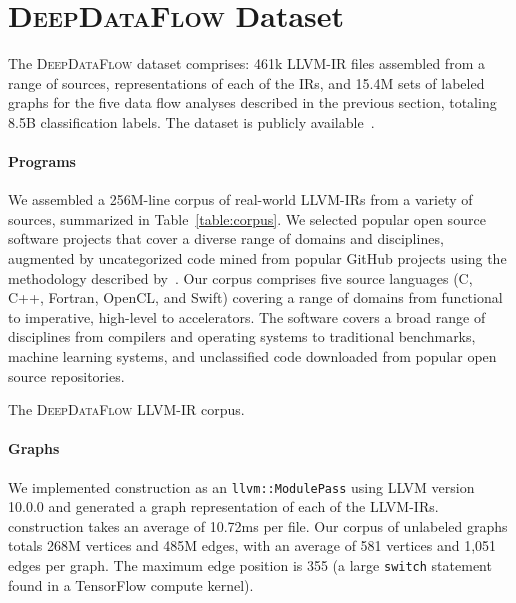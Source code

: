 \section{\textsc{DeepDataFlow} Dataset}

The \textsc{DeepDataFlow} dataset comprises: 461k LLVM-IR files assembled from a
range of sources, \programl representations of each of the IRs, and 15.4M sets
of labeled graphs for the five data flow analyses described in the previous
section, totaling 8.5B classification labels. The dataset is publicly
available~\cite{chris_cummins_2020_4247595}.

\paragraph{Programs} We assembled a 256M-line corpus of real-world LLVM-IRs from
a variety of sources, summarized in Table~\ref{table:corpus}. We selected
popular open source software projects that cover a diverse range of domains and
disciplines, augmented by uncategorized code mined from popular GitHub projects
using the methodology described by~\citet{Cummins2017a}. Our corpus comprises
five source languages (C, C++, Fortran, OpenCL, and Swift) covering a range of
domains from functional to imperative, high-level to accelerators. The software
covers a broad range of disciplines from compilers and operating systems to
traditional benchmarks, machine learning systems, and unclassified code
downloaded from popular open source repositories.

\begin{table*}
  \centering%
  \caption{The \textsc{DeepDataFlow} LLVM-IR corpus.}%
  \vspace{.5em}
  \label{table:corpus} %
\end{table*}

\paragraph{\programl Graphs} We implemented \programl construction as an
\texttt{llvm::ModulePass} using LLVM version 10.0.0 and generated a graph
representation of each of the LLVM-IRs. \programl construction takes an average
of 10.72ms per file. Our corpus of unlabeled graphs totals 268M vertices and
485M edges, with an average of 581 vertices and 1,051 edges per graph. The
maximum edge position is 355 (a large \texttt{switch} statement found in a
TensorFlow compute kernel).

